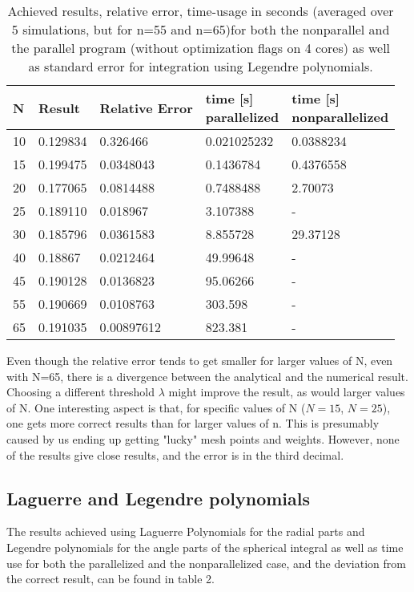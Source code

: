 \documentclass[10pt,a4paper]{article}
\begin{document}
\begin{table}[H]
\caption[Cartesian Quadrature using Legendre polynomials]{Achieved results, relative error, time-usage in seconds (averaged over 5 simulations, but for n=55 and n=65)for both the nonparallel and the parallel program (without optimization flags on 4 cores) as well as standard error for integration using Legendre polynomials. }
\begin{tabular}{|l|l|l|l|l|}
\hline
N          & Result   & Relative Error & \pbox{10cm}{time {[}s{]}\\ parallelized}  &  \pbox{10cm}{time {[}s{]}\\ nonparallelized} \\ \hline
10 & 0.129834 & 0.326466       & 0.021025232                             & 0.0388234 \\ \hline
15 & 0.199475 & 0.0348043      & 0.1436784                               & 0.4376558 \\ \hline
20 & 0.177065 & 0.0814488      & 0.7488488                               & 2.70073   \\ \hline
25 & 0.189110  & 0.018967       & 3.107388                                & -       \\ \hline
30 & 0.185796 & 0.0361583      & 8.855728                                & 29.37128  \\ \hline
40 & 0.18867  & 0.0212464      & 49.99648                                & -       \\ \hline
45 & 0.190128 & 0.0136823      & 95.06266                                & -       \\ \hline
55 & 0.190669 & 0.0108763      & 303.598                                 & -       \\ \hline
65 & 0.191035 & 0.00897612     & 823.381                                 & -       \\ \hline
\end{tabular}
\end{table}
Even though the relative error tends to get smaller for larger values of N, even with N=65, there is a divergence between the analytical and the numerical result. Choosing a different threshold $\lambda$ might improve the result, as would larger values of N. One interesting aspect is that, for specific values of N ($N=15$, $N=25$), one gets more correct results than for larger values of n. This is presumably caused by us ending up getting "lucky" mesh points and weights. However, none of the results give close results, and the error is in the third decimal.
\subsection{Laguerre and Legendre polynomials}
The results achieved using Laguerre Polynomials for the radial parts and Legendre polynomials for the angle parts of the spherical integral as well as time use for both the parallelized and the nonparallelized case, and the deviation from the correct result, can be found in table 2.
\end{document}
